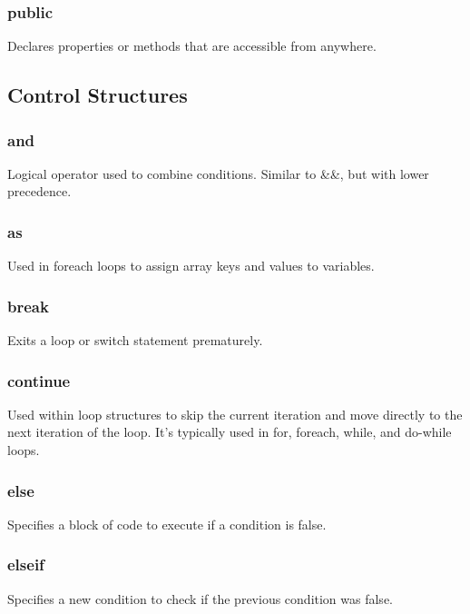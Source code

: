 \documentclass{report}
\begin{document}
    \bigbreak \noindent 
    \subsubsection{public}
    \bigbreak \noindent 
    Declares properties or methods that are accessible from anywhere.

    \pagebreak 
    \subsection{Control Structures}
    \bigbreak \noindent 
    \subsubsection{and}
    Logical operator used to combine conditions. Similar to \&\&, but with lower precedence.

    \bigbreak \noindent 
    \subsubsection{as}
    \bigbreak \noindent 
    Used in foreach loops to assign array keys and values to variables.
    
    \bigbreak \noindent 
    \subsubsection{break}
    Exits a loop or switch statement prematurely.

    \bigbreak \noindent 
    \subsubsection{continue}
    \bigbreak \noindent 
    Used within loop structures to skip the current iteration and move directly to the next iteration of the loop. It’s typically used in for, foreach, while, and do-while loops.

    \bigbreak \noindent 
    \subsubsection{else}
    \bigbreak \noindent 
    Specifies a block of code to execute if a condition is false.

    \bigbreak \noindent 
    \subsubsection{elseif}
    \bigbreak \noindent 
    Specifies a new condition to check if the previous condition was false.
\end{document}
